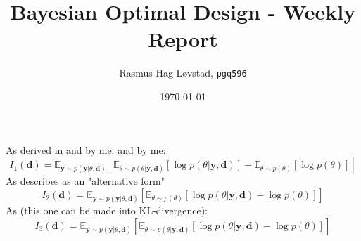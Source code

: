\documentclass[12pt,usenames]{article}
\title{Bayesian Optimal Design - Weekly Report}
\author{Rasmus Hag Løvstad, \texttt{pgq596}}
\date{\today}
\newcommand{\B}[1]{\mathbf{#1}}
\begin{document}
\maketitle
\tableofcontents
As derived in \citet{lindley56} and by me: and by me:
\begin{equation}
  I_1(\B{d}) = \mathbb{E}_{\B{y} \sim p(\B{y} | \theta, \B{d})} \left[\mathbb{E}_{\theta \sim p(\theta | \B{y}, \B{d})}[\log p(\theta | \B{y}, \B{d})] - \mathbb{E}_{\theta \sim p(\theta)} \left[ \log p(\theta) \right] \right]
\end{equation}
As \citet{lindley56} describes as an "alternative form"
\begin{equation}
  I_2(\B{d}) = \mathbb{E}_{\B{y} \sim p(\B{y} | \theta, \B{d})} \left[\mathbb{E}_{\theta \sim p(\theta)}[\log p(\theta | \B{y}, \B{d}) - \log p(\theta)] \right]
\end{equation}
As \citet{ryan15} (this one can be made into KL-divergence):
\begin{equation}
  I_3(\B{d}) = \mathbb{E}_{\B{y} \sim p(\B{y} | \theta, \B{d})} \left[\mathbb{E}_{\theta \sim p(\theta | \B{y}, \B{d})}[\log p(\theta | \B{y}, \B{d}) - \log p(\theta)] \right]
\end{equation}








\printbibliography[heading=bibintoc]
\end{document}
